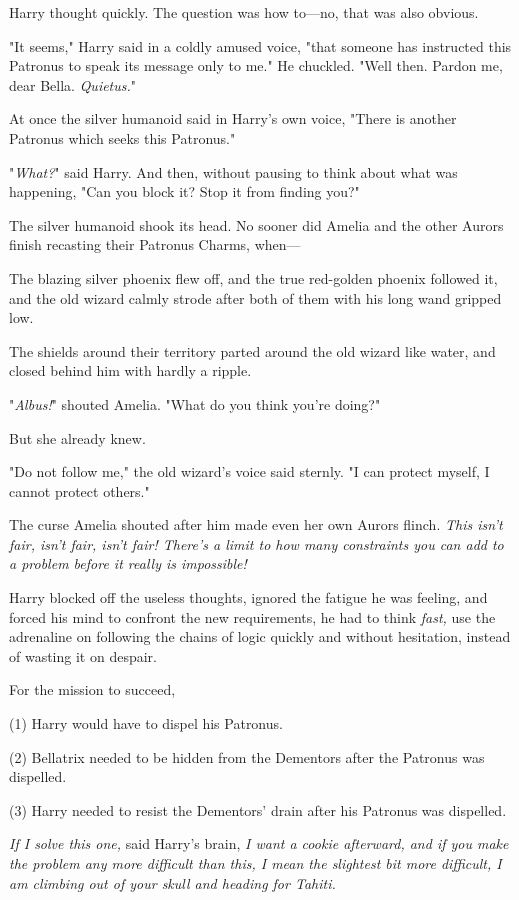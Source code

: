Harry thought quickly. The question was how to—no, that was also obvious.

"It seems," Harry said in a coldly amused voice, "that someone has instructed
this Patronus to speak its message only to me." He chuckled. "Well then. Pardon
me, dear Bella. \emph{Quietus.}"

At once the silver humanoid said in Harry's own voice, "There is another
Patronus which seeks this Patronus."

"\emph{What?}" said Harry. And then, without pausing to think about what was
happening, "Can you block it? Stop it from finding you?"

The silver humanoid shook its head.
\sbreak
No sooner did Amelia and the other Aurors finish recasting their Patronus
Charms, when—

The blazing silver phoenix flew off, and the true red-golden phoenix followed
it, and the old wizard calmly strode after both of them with his long wand
gripped low.

The shields around their territory parted around the old wizard like water, and
closed behind him with hardly a ripple.

"\emph{Albus!}" shouted Amelia. "What do you think you're doing?"

But she already knew.

"Do not follow me," the old wizard's voice said sternly. "I can protect myself,
I cannot protect others."

The curse Amelia shouted after him made even her own Aurors flinch.
\sbreak
\emph{This isn't fair, isn't fair, isn't fair! There's a limit to how many
constraints you can add to a problem before it really is impossible!}

Harry blocked off the useless thoughts, ignored the fatigue he was feeling, and
forced his mind to confront the new requirements, he had to think \emph{fast,}
use the adrenaline on following the chains of logic quickly and without
hesitation, instead of wasting it on despair.

For the mission to succeed,

(1) Harry would have to dispel his Patronus.

(2) Bellatrix needed to be hidden from the Dementors after the Patronus was
dispelled.

(3) Harry needed to resist the Dementors' drain after his Patronus was
dispelled.

{\el}

\emph{If I solve this one,} said Harry's brain, \emph{I want a cookie
afterward, and if you make the problem any more difficult than this, I mean the
slightest bit more difficult, I am climbing out of your skull and heading for
Tahiti.}

